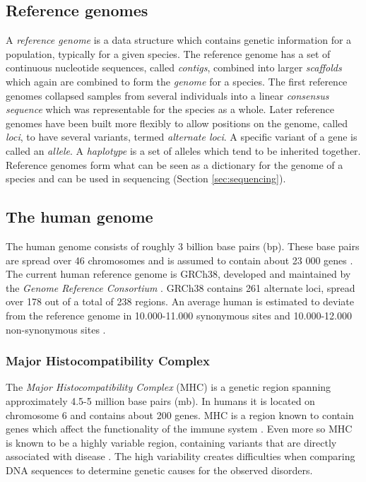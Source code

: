 \documentclass[thesis.tex]{subfiles}
\begin{document}
\subsection{Reference genomes}
A \textit{reference genome} is a data structure which contains genetic information for a population, typically for a given species. The reference genome has a set of continuous nucleotide sequences, called \textit{contigs}, combined into larger \textit{scaffolds} which again are combined to form the \textit{genome} for a species. The first reference genomes collapsed samples from several individuals into a linear \textit{consensus sequence} which was representable for the species as a whole. Later reference genomes have been built more flexibly to allow positions on the genome, called \textit{loci}, to have several variants, termed \textit{alternate loci}. A specific variant of a gene is called an \textit{allele}. A \textit{haplotype} is a set of alleles which tend to be inherited together. Reference genomes form what can be seen as a dictionary for the genome of a species and can be used in sequencing (Section \ref{sec:sequencing}).
\subsection{The human genome}
The human genome consists of roughly 3 billion base pairs (bp). These base pairs are spread over 46 chromosomes and is assumed to contain about 23 000 genes \cite{introduction_to_genomics}. The current human reference genome is GRCh38\cite{grch38}, developed and maintained by the \textit{Genome Reference Consortium} \cite{genome_reference_consortium}. GRCh38 contains 261 alternate loci, spread over 178 out of a total of 238 regions. An average human is estimated to deviate from the reference genome in 10.000-11.000 synonymous sites and 10.000-12.000 non-synonymous sites \cite{a_map_of_human_genome_variation_from_population_scale_sequencing}.
\subsubsection{Major Histocompatibility Complex}
\label{sec:mhc}
The \textit{Major Histocompatibility Complex} (MHC) is a genetic region spanning approximately 4.5-5 million base pairs (mb)\cite{improved_genome_inference_in_the_mhc_using_a_population_reference_graph}\cite{canonical_stable_general_mapping_using_context_schemes}. In humans it is located on chromosome 6 and contains about 200 genes. MHC is a region known to contain genes which affect the functionality of the immune system \cite{the_importance_of_immune_gene_variability_in_evolutionary_ecology_and_conservation}. Even more so MHC is known to be a highly variable region, containing variants that are directly associated with disease \cite{variation_analysis_and_gene_annotation_of_eight_mhc_haplotypes}. The high variability creates difficulties when comparing DNA sequences to determine genetic causes for the observed disorders.
\end{document}
